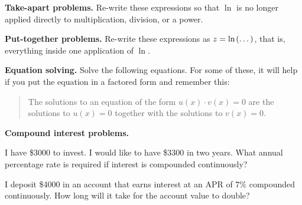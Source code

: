 
\textbf{Take-apart problems.}
Re-write these expressions so that $\ln$ is no longer applied directly to multiplication, division, or a power.

\begin{multicols}{2}
 \begin{ProblemSet}[pencil space=3.5in]
 \end{ProblemSet}
\end{multicols}
\newpage

\textbf{Put-together problems.}
Re-write these expressions as $z = \mathrm{ln}\hspace{-0.1ex}\left(\dots\right)$, that is, everything inside one application of $\ln$.

\begin{multicols}{2}
 \begin{ProblemSet}[pencil space=4in]
 \end{ProblemSet}
\end{multicols}
\newpage

\textbf{Equation solving.}
Solve the following equations.
For some of these, it will help if you put the equation in a factored form and remember this:
\begin{quote}
 The solutions to an equation of the form $u(x) \cdot v(x) = 0$ are the solutions to $u(x) = 0$ together with the solutions to $v(x) = 0$.
\end{quote}

\begin{multicols}{2}
 \begin{ProblemSet}[pencil space=4in]

 \end{ProblemSet}
\end{multicols}

\newpage

\textbf{Compound interest problems.}

\begin{ProblemSet}[pencil space=4in]
 \begin{Problem}
  I have \$3000 to invest.
  I would like to have \$3300 in two years.
  What annual percentage rate is required if interest is compounded continuously?
 \end{Problem}

 \begin{Problem}
  I deposit \$4000 in an account that earns interest at an APR of $7\%$ compounded continuously.
  How long will it take for the account value to double?
 \end{Problem}
\end{ProblemSet}

